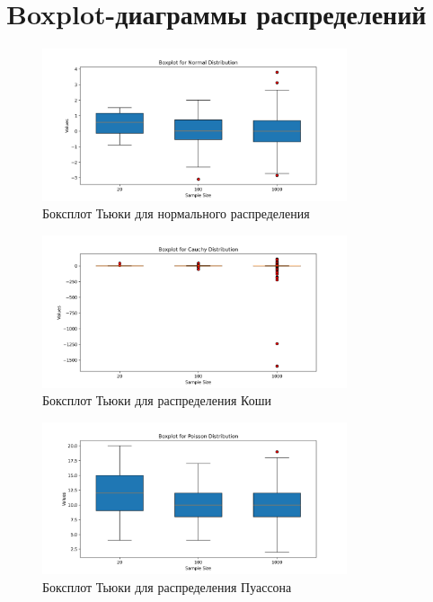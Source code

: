 \documentclass[a4paper]{article}
\begin{document}
    \section{Boxplot-диаграммы распределений}\label{sec:boxplots}
    \begin{figure}[H]
        \centering
        \includegraphics[width=0.8\textwidth]{./plots/normal_boxplot}
        \caption{Боксплот Тьюки для нормального распределения}
        \label{fig:normal_boxplot}
    \end{figure}

    \begin{figure}[H]
        \centering
        \includegraphics[width=0.8\textwidth]{./plots/cauchy_boxplot}
        \caption{Боксплот Тьюки для распределения Коши}
        \label{fig:cauchy_boxplot}
    \end{figure}

    \begin{figure}[H]
        \centering
        \includegraphics[width=0.8\textwidth]{./plots/poisson_boxplot}
        \caption{Боксплот Тьюки для распределения Пуассона}
        \label{fig:poisson_boxplot}
    \end{figure}
\end{document}
